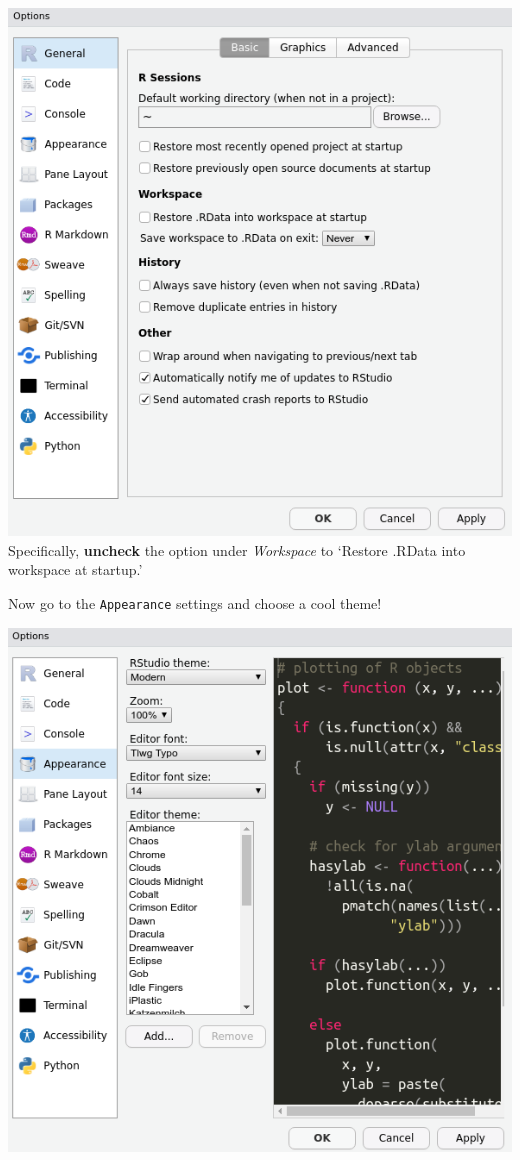 \documentclass[
]{book}
\begin{document}
\includegraphics{img/rstudio_settings.png}
Specifically, \textbf{uncheck} the option under \emph{Workspace} to `Restore .RData into workspace at startup.'

Now go to the \texttt{Appearance} settings and choose a cool theme!

\includegraphics{img/rstudio_theme.png}
\end{document}
